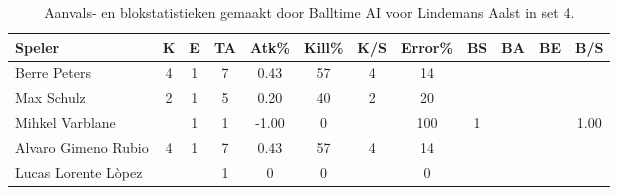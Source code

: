 \begin{table}[ht!]
  \centering
  \scriptsize
  \begin{tabular}{|l|c|c|c|c|c|c|c|c|c|c|c|} \hline
    \textbf{Speler} &  K & E & TA & Atk\% & Kill\% & K/S & Error\% & BS & BA & BE & B/S\\ \hline
    Berre Peters & 4 & 1 & 7 & 0.43 & 57 & 4 & 14 &  &  & & \\
    Max Schulz & 2 & 1 & 5 & 0.20 & 40 & 2 & 20 &  &  & & \\
    Mihkel Varblane &  & 1 & 1 & -1.00 & 0 &  & 100 & 1 & & & 1.00 \\
    Alvaro Gimeno Rubio & 4 & 1 & 7 & 0.43 & 57 & 4 & 14 &  &  & &\\
    Lucas Lorente Lòpez &  &  & 1 & 0 & 0 &  & 0 &  &  & & \\ \hline
  \end{tabular}
  \caption[Aanvals- en blokstatistieken gemaakt door Balltime AI voor Lindemans Aalst in set 4]{\label{tab:PL3AttBlockAalstAI4}Aanvals- en blokstatistieken gemaakt door Balltime AI voor Lindemans Aalst in set 4.}
\end{table}
